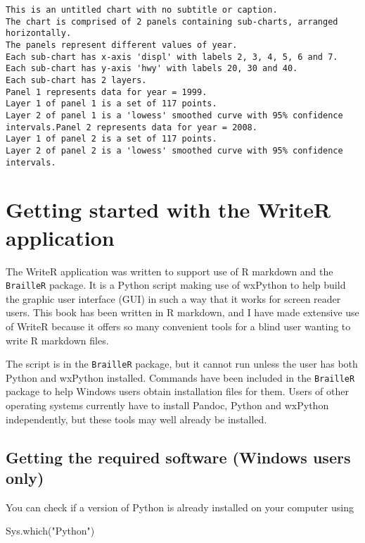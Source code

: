 \documentclass[
]{book}
\newenvironment{Shaded}{\begin{snugshade}}{\end{snugshade}}
\newcommand{\FunctionTok}[1]{\textcolor[rgb]{0.00,0.00,0.00}{#1}}
\newcommand{\NormalTok}[1]{#1}
\newcommand{\StringTok}[1]{\textcolor[rgb]{0.31,0.60,0.02}{#1}}
\begin{document}
\begin{verbatim}
This is an untitled chart with no subtitle or caption.
The chart is comprised of 2 panels containing sub-charts, arranged horizontally.
The panels represent different values of year.
Each sub-chart has x-axis 'displ' with labels 2, 3, 4, 5, 6 and 7.
Each sub-chart has y-axis 'hwy' with labels 20, 30 and 40.
Each sub-chart has 2 layers.
Panel 1 represents data for year = 1999.
Layer 1 of panel 1 is a set of 117 points.
Layer 2 of panel 1 is a 'lowess' smoothed curve with 95% confidence intervals.Panel 2 represents data for year = 2008.
Layer 1 of panel 2 is a set of 117 points.
Layer 2 of panel 2 is a 'lowess' smoothed curve with 95% confidence intervals.
\end{verbatim}

\hypertarget{WriteR}{%
\chapter{Getting started with the WriteR application}\label{WriteR}}

The WriteR application was written to support use of R markdown and the \texttt{BrailleR} package. It is a Python script making use of wxPython to help build the graphic user interface (GUI) in such a way that it works for screen reader users. This book has been written in R markdown, and I have made extensive use of WriteR because it offers so many convenient tools for a blind user wanting to write R markdown files.

The script is in the \texttt{BrailleR} package, but it cannot run unless the user has both Python and wxPython installed. Commands have been included in the \texttt{BrailleR} package to help Windows users obtain installation files for them. Users of other operating systems currently have to install Pandoc, Python and wxPython independently, but these tools may well already be installed.

\hypertarget{getting-the-required-software-windows-users-only}{%
\section{Getting the required software (Windows users only)}\label{getting-the-required-software-windows-users-only}}

You can check if a version of Python is already installed on your computer using

\begin{Shaded}
\begin{Highlighting}[]
\FunctionTok{Sys.which}\NormalTok{(}\StringTok{"Python"}\NormalTok{)}
\end{Highlighting}
\end{Shaded}
\end{document}
